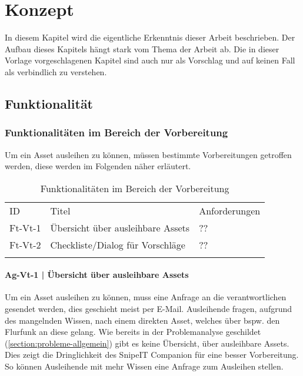 \chapter{Konzept}
\label{chapter-konzept}

In diesem Kapitel wird die eigentliche Erkenntnis dieser Arbeit beschrieben. Der Aufbau dieses
Kapitels hängt stark vom Thema der Arbeit ab. Die in dieser Vorlage vorgeschlagenen Kapitel sind
auch nur als Vorschlag und auf keinen Fall als verbindlich zu verstehen.

\section{Funktionalität}
\subsection{Funktionalitäten im Bereich der Vorbereitung}
Um ein Asset ausleihen zu können, müssen bestimmte Vorbereitungen getroffen werden, diese werden im
Folgenden näher erläutert.

\begin{table}[h]
    \centering
    \caption{Funktionalitäten im Bereich der Vorbereitung}
    \begin{tabular}{lll}
            \arrayrulecolor{maincolor}\hline
            \sffamily\color{maincolor}ID & \sffamily\color{maincolor}Titel &
            \sffamily\color{maincolor}Anforderungen \\
            \arrayrulecolor{maincolor}\hline
            Ft-Vt-1 & Übersicht über ausleihbare Assets                              & ?? \\
            Ft-Vt-2 & Checkliste/Dialog für Vorschläge                             & ?? \\
            \arrayrulecolor{maincolor}\hline
    \end{tabular}
    \label{table:ft-vt}
\end{table}

\subsubsection{Ag-Vt-1 | Übersicht über ausleihbare Assets}
\label{subsubsection:Ag-Vt-1}
Um ein Asset ausleihen zu können, muss eine Anfrage an die verantwortlichen gesendet werden, dies
geschieht meist per E-Mail. Ausleihende fragen, aufgrund des mangelnden Wissen, nach einem direkten
Asset, welches über bspw. den Flurfunk an diese gelang. Wie bereits in der Problemanalyse geschildet
(\ref{section:probleme-allgemein}) gibt es keine Übersicht, über ausleihbare Assets. Dies zeigt die
Dringlichkeit des SnipeIT Companion für eine besser Vorbereitung. So können Ausleihende mit mehr
Wissen eine Anfrage zum Ausleihen stellen. 
